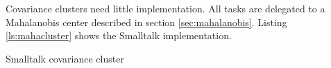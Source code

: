 \documentclass[twoside]{book}
\begin{document}
 Covariance clusters need little
implementation. All tasks are delegated to a Mahalanobis center
described in section \ref{sec:mahalanobis}. Listing
\ref{ls:mahacluster} shows the Smalltalk implementation.

\begin{listing} Smalltalk covariance cluster \label{ls:mahacluster}

\end{listing}

\ifx\wholebook\relax\else
\end{document}

